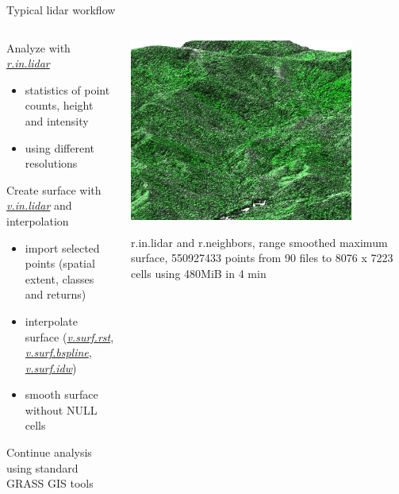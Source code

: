 \documentclass[xcolor={dvipsnames,usenames},beamer,aspectratio=169]{beamer}
\newcommand{\gmodule}[1]{\href{http://grass.osgeo.org/grass71/manuals/#1.html}{\emph{#1}}}
\begin{document}
\begin{frame}{Typical lidar workflow}


\begin{columns}
\begin{column}{0.5\textwidth}

Analyze with \gmodule{r.in.lidar}
 \begin{itemize}
  \item statistics of point counts, height and intensity
  \item using different resolutions
 \end{itemize}

Create surface with \gmodule{v.in.lidar} and interpolation
 \begin{itemize}
  \item import selected points (spatial extent, classes and returns)
  \item interpolate surface (\gmodule{v.surf.rst}, \gmodule{v.surf.bspline}, \gmodule{v.surf.idw})
  \item smooth surface without NULL cells
  \end{itemize}

Continue analysis using standard GRASS GIS tools

\end{column}
\begin{column}{0.45\textwidth}

\begin{center}
  \includegraphics[width=0.8\textwidth]{grass/range_on_smooth_max_larger}

  \footnotesize
  r.in.lidar and r.neighbors, range smoothed maximum surface,
  550927433 points from 90 files to 8076 x 7223 cells
  using 480MiB in 4 min
\end{center}


\end{column}
\end{columns}
\end{frame}
\end{document}
